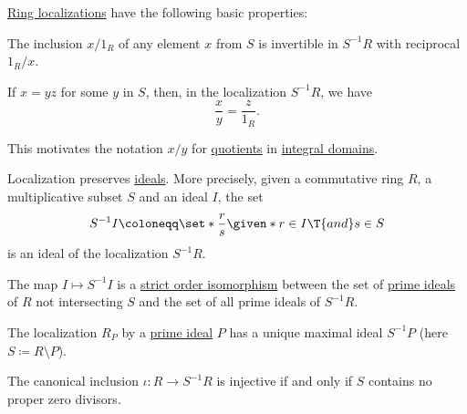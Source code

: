 \begin{proposition}\label{thm:def:ring_localization}
  \hyperref[def:ring_localization]{Ring localizations} have the following basic properties:

  \begin{thmenum}
     The inclusion \( x / 1_R \) of any element \( x \) from \( S \) is invertible in \( S^{-1} R \) with reciprocal \( 1_R / x \).

     If \( x = yz \) for some \( y \) in \( S \), then, in the localization \( S^{-1} R \), we have
    \begin{equation*}
      \frac x y = \frac z {1_R}.
    \end{equation*}

    This motivates the notation \( x / y \) for \hyperref[def:domain_quotient]{quotients} in \hyperref[def:integral_domain]{integral domains}.

     Localization preserves \hyperref[def:semiring_ideal]{ideals}. More precisely, given a commutative ring \( R \), a multiplicative subset \( S \) and an ideal \( I \), the set
    \begin{equation*}
      S^{-1} I \coloneqq \set*{ \frac r s \given* r \in I \T{and} s \in S }
    \end{equation*}
    is an ideal of the localization \( S^{-1} R \).

     The map \( I \mapsto S^{-1} I \) is a \hyperref[def:preordered_set/homomorphism]{strict order isomorphism} between the set of \hyperref[def:ring/subobject]{prime ideals} of \( R \) not intersecting \( S \) and the set of all prime ideals of \( S^{-1} R \).

     The localization \( R_P \) by a \hyperref[def:semiring_ideal/prime]{prime ideal} \( P \) has a unique maximal ideal \( S^{-1} P \) (here \( S \coloneqq R \setminus P \)).

     The canonical inclusion \( \iota: R \to S^{-1} R \) is injective if and only if \( S \) contains no proper zero divisors.
  \end{thmenum}
\end{proposition}
